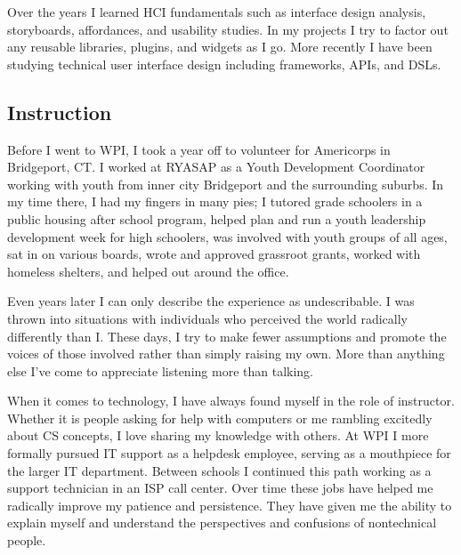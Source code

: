 Over the years I learned HCI fundamentals such as interface design
analysis, storyboards, affordances, and usability studies. In my
projects I try to factor out any reusable libraries, plugins, and
widgets as I go. More recently I have been studying technical user
interface design including frameworks, APIs, and DSLs.


\subsection*{Instruction}

Before I went to WPI, I took a year off to volunteer for Americorps in
Bridgeport, CT. I worked at RYASAP as a Youth Development Coordinator
working with youth from inner city Bridgeport and the surrounding
suburbs. In my time there, I had my fingers in many pies; I tutored
grade schoolers in a public housing after school program, helped plan
and run a youth leadership development week for high schoolers, was
involved with youth groups of all ages, sat in on various boards, wrote
and approved grassroot grants, worked with homeless shelters, and helped
out around the office.

Even years later I can only describe the experience as undescribable.
I was thrown into situations with individuals who perceived the
world radically differently than I. These days, I try to make fewer
assumptions and promote the voices of those involved rather than simply
raising my own. More than anything else I’ve come to appreciate
listening more than talking. 

When it comes to technology, I have always
found myself in the role of instructor. Whether it is people asking
for help with computers or me rambling excitedly about CS concepts, I
love sharing my knowledge with others. At WPI I more formally pursued
IT support as a helpdesk employee, serving as a mouthpiece for the
larger IT department. Between schools I continued this path working as
a support technician in an ISP call center. Over time these jobs have
helped me radically improve my patience and persistence. They have given
me the ability to explain myself and understand the perspectives and
confusions of nontechnical people.

